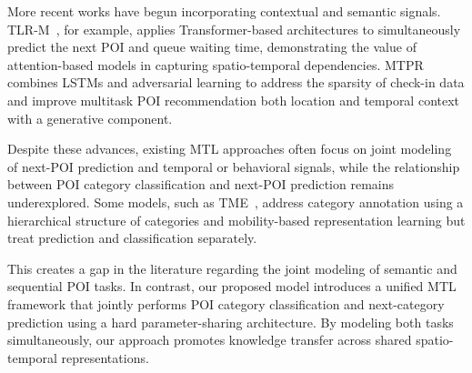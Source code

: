 More recent works have begun incorporating contextual and semantic signals. TLR-M~\cite{Halder2021}, for example, applies Transformer-based architectures to simultaneously predict the next POI and queue waiting time, demonstrating the value of attention-based models in capturing spatio-temporal dependencies. MTPR~\cite{Xia2020} combines LSTMs and adversarial learning to address the sparsity of check-in data and improve multitask POI recommendation both location and temporal context with a generative component.

Despite these advances, existing MTL approaches often focus on joint modeling of next-POI prediction and temporal or behavioral signals, while the relationship between POI category classification and next-POI prediction remains underexplored. Some models, such as TME~\cite{Xu2023}, address category annotation using a hierarchical structure of categories and mobility-based representation learning but treat prediction and classification separately.

This creates a gap in the literature regarding the joint modeling of semantic and sequential POI tasks. In contrast, our proposed model introduces a unified MTL framework that jointly performs POI category classification and next-category prediction using a hard parameter-sharing architecture. By modeling both tasks simultaneously, our approach promotes knowledge transfer across shared spatio-temporal representations.
